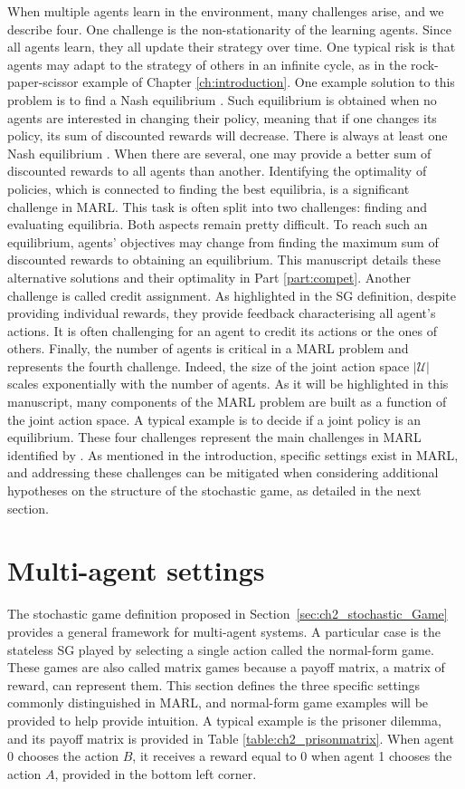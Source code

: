 When multiple agents learn in the environment, many challenges arise, and we describe four.
One challenge is the non-stationarity of the learning agents.
Since all agents learn, they all update their strategy over time.
One typical risk is that agents may adapt to the strategy of others in an infinite cycle, as in the rock-paper-scissor example of Chapter \ref{ch:introduction}.
One example solution to this problem is to find a Nash equilibrium \citep{nash1950equilibrium}.
Such equilibrium is obtained when no agents are interested in changing their policy, meaning that if one changes its policy, its sum of discounted rewards will decrease.
There is always at least one Nash equilibrium \citep{nash1950equilibrium}.
When there are several, one may provide a better sum of discounted rewards to all agents than another.
Identifying the optimality of policies, which is connected to finding the best equilibria, is a significant challenge in MARL.
This task is often split into two challenges: finding and evaluating equilibria.
Both aspects remain pretty difficult.
To reach such an equilibrium, agents' objectives may change from finding the maximum sum of discounted rewards to obtaining an equilibrium.
This manuscript details these alternative solutions and their optimality in Part \ref{part:compet}.
Another challenge is called credit assignment.
As highlighted in the SG definition, despite providing individual rewards, they provide feedback characterising all agent's actions.
It is often challenging for an agent to credit its actions or the ones of others.
Finally, the number of agents is critical in a MARL problem and represents the fourth challenge.
Indeed, the size of the joint action space $|\mathcal{U}|$ scales exponentially with the number of agents.
As it will be highlighted in this manuscript, many components of the MARL problem are built as a function of the joint action space.
A typical example is to decide if a joint policy is an equilibrium.
These four challenges represent the main challenges in MARL identified by \cite{marl-book}.
As mentioned in the introduction, specific settings exist in MARL, and addressing these challenges can be mitigated when considering additional hypotheses on the structure of the stochastic game, as detailed in the next section.

\section{Multi-agent settings} 
\label{sec:ch2_multi_agent_settings}
The stochastic game definition proposed in Section~\ref{sec:ch2_stochastic_Game} provides a general framework for multi-agent systems.
A particular case is the stateless SG played by selecting a single action called the normal-form game.
These games are also called matrix games because a payoff matrix, a matrix of reward, can represent them.
This section defines the three specific settings commonly distinguished in MARL, and normal-form game examples will be provided to help provide intuition.
A typical example is the prisoner dilemma, and its payoff matrix is provided in Table \ref{table:ch2_prisonmatrix}.
When agent 0 chooses the action $B$, it receives a reward equal to 0 when agent 1 chooses the action $A$, provided in the bottom left corner.

